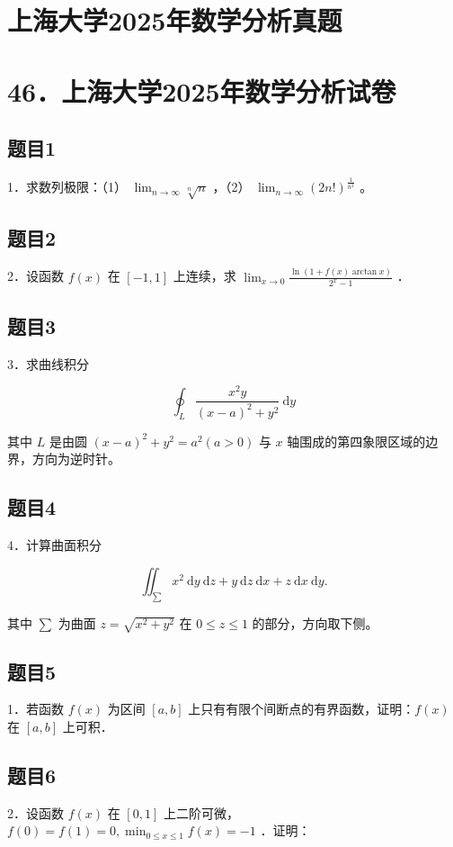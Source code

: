 \documentclass{article}
\begin{document}
\section*{上海大学2025年数学分析真题}
\section*{46．上海大学2025年数学分析试卷}

\subsection{题目1}
1．求数列极限：（1） \(\lim _{n \rightarrow \infty} \sqrt[n]{n}\) ，（2） \(\lim _{n \rightarrow \infty}(2 n!)^{\frac{1}{n^{2}}}\) 。

\subsection{题目2}
2．设函数 \(f(x)\) 在 \([-1,1]\) 上连续，求 \(\lim _{x \rightarrow 0} \frac{\ln (1+f(x) \arctan x)}{2^{x}-1}\) ．

\subsection{题目3}
3．求曲线积分

\[
\oint_{L} \frac{x^{2} y}{(x-a)^{2}+y^{2}} \mathrm{~d} y
\]

其中 \(L\) 是由圆 \((x-a)^{2}+y^{2}=a^{2}(a>0)\) 与 \(x\) 轴围成的第四象限区域的边界，方向为逆时针。

\subsection{题目4}
4．计算曲面积分

\[
\iint_{\sum} x^{2} \mathrm{~d} y \mathrm{~d} z+y \mathrm{~d} z \mathrm{~d} x+z \mathrm{~d} x \mathrm{~d} y .
\]

其中 \(\sum\) 为曲面 \(z=\sqrt{x^{2}+y^{2}}\) 在 \(0 \leq z \leq 1\) 的部分，方向取下侧。

\subsection{题目5}
1．若函数 \(f(x)\) 为区间 \([a, b]\) 上只有有限个间断点的有界函数，证明：\(f(x)\) 在 \([a, b]\) 上可积．

\subsection{题目6}
2．设函数 \(f(x)\) 在 \([0,1]\) 上二阶可微，\(f(0)=f(1)=0, \min _{0 \leq x \leq 1} f(x)=-1\) ．证明：
\end{document}
